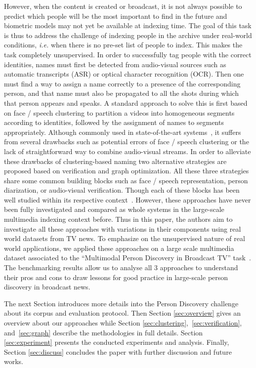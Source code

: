However, when the content is created or broadcast, it is not always possible to predict which people will be the most important to find in the future and biometric models may not yet be available at indexing time.
%
The goal of this task is thus to address the challenge of indexing people in the archive under real-world conditions, \emph{i.e.} when there is no pre-set list of people to index.
%
This makes the task completely unsupervised.
%
In order to successfully tag people with the correct identities, names must first be detected from audio-visual sources such as automatic transcripts (ASR) or optical character recognition (OCR).
%
Then one must find a way to assign a name correctly to a presence of the corresponding person, and that name must also be propagated to all the shots during which that person appears and speaks. 
%
A standard approach to solve this is first based on face / speech clustering to partition a videos into homogeneous segments according to identities, followed by the assignment of names to segments appropriately.
%
Although commonly used in state-of-the-art systems~\cite{le2015eumssi,poignant2012fusion}, it suffers from several drawbacks such as potential errors of face / speech clustering or the lack of straightforward way to combine audio-visual streams.
%
In order to alleviate these drawbacks of clustering-based naming %
two alternative strategies are proposed based on verification and graph optimization. 
%
All these three strategies share some common building blocks such as face / speech representation, person diarization, or audio-visual verification. Though each of these blocks has been well studied within its respective context~\cite{parkhi15deep,wallace2012total,Schroff2015,Ben}. 
%
However, these approaches have never been fully investigated and compared as whole systems in the large-scale multimedia indexing context before. Thus in this paper, the authors aim to investigate all these approaches with variations in their components using real world datasets from TV news. 
%
To emphasize on the unsupervised nature of real world applications, we applied these approaches on a large scale multimedia dataset associated to the ``Multimodal Person Discovery in Broadcast TV'' task~\cite{POIGNANT--MEDIAEVAL--2015,bredin2016mediaeval}.
%
The benchmarking results allow us to analyse all 3 approaches to understand their pros and cons to draw lessons for good practice in large-scale person discovery in broadcast news.

The next Section introduces more details into the Person Discovery challenge about its corpus and evaluation protocol.
Then Section \ref{sec:overview} gives an overview about our approaches while Section \ref{sec:clustering},~\ref{sec:verification}, and~\ref{sec:graph} describe the methodologies in full details.
Section \ref{sec:experiment} presents the conducted experiments and analysis.
%
Finally, Section \ref{sec:discuss} concludes the paper 
with further discussion and future works.

\endinput
